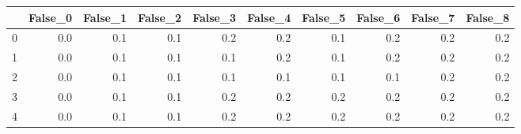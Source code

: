 \begin{tabular}{lrrrrrrrrr}
\toprule
{} &  False\_0 &  False\_1 &  False\_2 &  False\_3 &  False\_4 &  False\_5 &  False\_6 &  False\_7 &  False\_8 \\ \hline
\midrule
0 &      0.0 &      0.1 &      0.1 &      0.2 &      0.2 &      0.1 &      0.2 &      0.2 &      0.2 \\ \hline
1 &      0.0 &      0.1 &      0.1 &      0.1 &      0.2 &      0.1 &      0.2 &      0.2 &      0.2 \\ \hline
2 &      0.0 &      0.1 &      0.1 &      0.1 &      0.1 &      0.1 &      0.1 &      0.2 &      0.2 \\ \hline
3 &      0.0 &      0.1 &      0.1 &      0.2 &      0.2 &      0.2 &      0.2 &      0.2 &      0.2 \\ \hline
4 &      0.0 &      0.1 &      0.1 &      0.2 &      0.2 &      0.2 &      0.2 &      0.2 &      0.2 \\ \hline
\bottomrule
\end{tabular}
